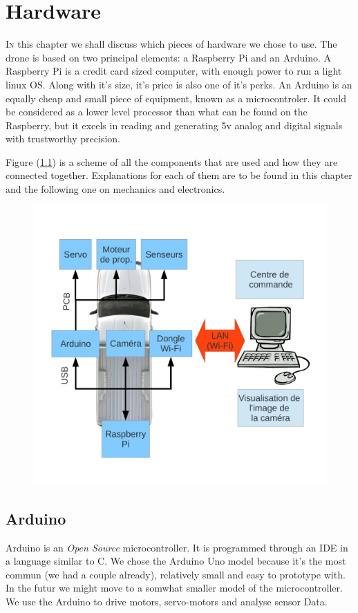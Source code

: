 \documentclass[a4paper,11pt]{report}
\begin{document}
{\chapter{Hardware}


\lettrine{I}{n} this chapter we shall discuss which pieces of hardware we chose
to use. The drone is based on two principal elements: a Raspberry Pi and an
Arduino. A Raspberry Pi is a credit card sized computer, with enough power
to run a light linux OS. Along with it's size, it's price is also one of it's
perks. An Arduino is an equally cheap and small piece of equipment, known as a
microcontroler. It could be considered as a lower level processor than what
can be found on the Raspberry, but it excels in reading and generating 5v
analog and digital signals with trustworthy precision.

Figure (\ref{SchemaProjet}) is a scheme of all the components that are used
and how they are connected together. Explanations for each of them are to be
found in this chapter and the following one on mechanics and electronics.

\begin{figure}[h]
  \includegraphics[width = 1.0\textwidth]{SchemaPres.pdf}
\caption[Schéma du hardware]{\label{SchemaProjet}}
\end{figure}

\section{Arduino}
Arduino is an \textit{Open Source} microcontroller. It is programmed through
an IDE in a language similar to C. We chose the Arduino Uno model because it's
the most commun (we had a couple already), relatively small and easy to
prototype with. In the futur we might move to a somwhat smaller model of the
microcontroller. We use the Arduino to drive motors, servo-motors and analyse
sensor Data. 

}
\end{document}
